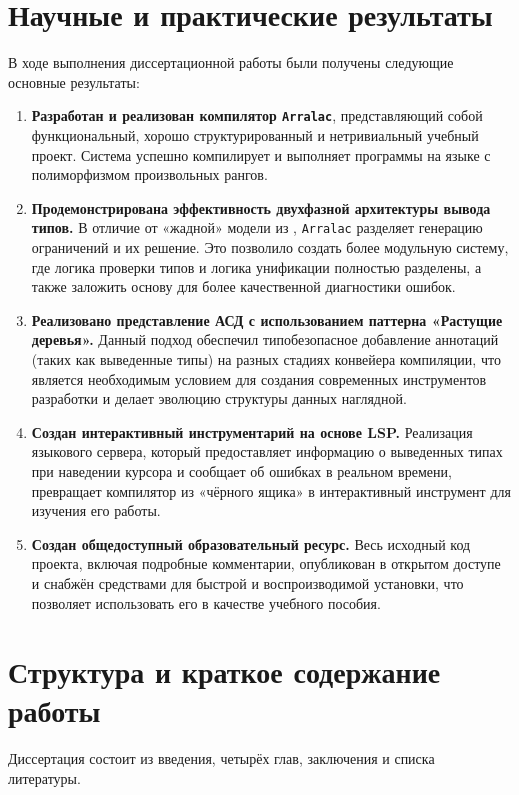 \section*{Научные и практические результаты}
В ходе выполнения диссертационной работы были получены следующие основные результаты:
\begin{enumerate}
    \item \textbf{Разработан и реализован компилятор \texttt{Arralac}}, представляющий собой функциональный, хорошо структурированный и нетривиальный учебный проект. Система успешно компилирует и выполняет программы на языке с полиморфизмом произвольных рангов.
    \item \textbf{Продемонстрирована эффективность двухфазной архитектуры вывода типов.} В отличие от «жадной» модели из \cite{jones-practical-2007}, \texttt{Arralac} разделяет генерацию ограничений и их решение. Это позволило создать более модульную систему, где логика проверки типов и логика унификации полностью разделены, а также заложить основу для более качественной диагностики ошибок.
    \item \textbf{Реализовано представление АСД с использованием паттерна «Растущие деревья».} Данный подход обеспечил типобезопасное добавление аннотаций (таких как выведенные типы) на разных стадиях конвейера компиляции, что является необходимым условием для создания современных инструментов разработки и делает эволюцию структуры данных наглядной.
    \item \textbf{Создан интерактивный инструментарий на основе LSP.} Реализация языкового сервера, который предоставляет информацию о выведенных типах при наведении курсора и сообщает об ошибках в реальном времени, превращает компилятор из «чёрного ящика» в интерактивный инструмент для изучения его работы.
    \item \textbf{Создан общедоступный образовательный ресурс.} Весь исходный код проекта, включая подробные комментарии, опубликован в открытом доступе и снабжён средствами для быстрой и воспроизводимой установки, что позволяет использовать его в качестве учебного пособия.
\end{enumerate}

\section*{Структура и краткое содержание работы}

Диссертация состоит из введения, четырёх глав, заключения и списка литературы.

